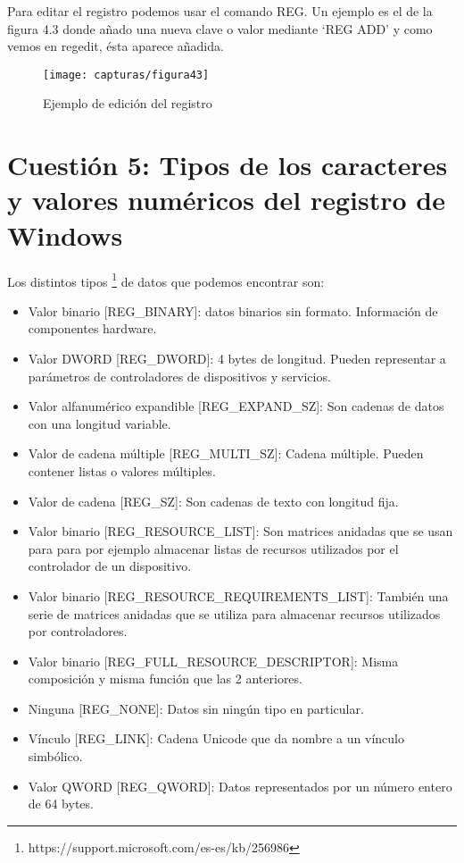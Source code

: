 	Para editar el registro podemos usar el comando REG. Un ejemplo es el de la figura 4.3 donde añado una nueva clave o valor mediante ‘REG ADD’ y como vemos en regedit, ésta aparece añadida.
	\begin{figure} [H]
	\centering
	\texttt{[image: capturas/figura43]}
	\caption{Ejemplo de edición del registro}
	\label{fig:figura43}
	\end{figure}
	
	\section{Cuestión 5: Tipos de los caracteres y valores numéricos del registro de Windows}
	Los distintos tipos \footnote{https://support.microsoft.com/es-es/kb/256986} de datos que podemos encontrar son:
	
	\begin{itemize}
	\item Valor binario [REG\_BINARY]: datos binarios sin formato. Información de componentes hardware.
	\item Valor DWORD [REG\_DWORD]: 4 bytes de longitud. Pueden representar a parámetros de controladores de dispositivos y servicios.
	\item Valor alfanumérico expandible [REG\_EXPAND\_SZ]: Son cadenas de datos con una longitud variable.
	\item Valor de cadena múltiple [REG\_MULTI\_SZ]: Cadena múltiple. Pueden contener listas o valores múltiples. 
	\item Valor de cadena [REG\_SZ]: Son cadenas de texto con longitud fija.
	\item Valor binario [REG\_RESOURCE\_LIST]:  Son matrices anidadas que se usan para para por ejemplo almacenar listas de recursos utilizados por el controlador de un dispositivo.
	\item Valor binario [REG\_RESOURCE\_REQUIREMENTS\_LIST]: También una serie de matrices anidadas que se utiliza para almacenar recursos utilizados por controladores.
	\item Valor binario [REG\_FULL\_RESOURCE\_DESCRIPTOR]: Misma composición y misma función que las 2 anteriores.
	\item Ninguna [REG\_NONE]: Datos sin ningún tipo en particular.
	\item Vínculo [REG\_LINK]: Cadena Unicode que da nombre a un vínculo simbólico.
	\item Valor QWORD [REG\_QWORD]: Datos representados por un número entero de 64 bytes.
	\end{itemize}
	
